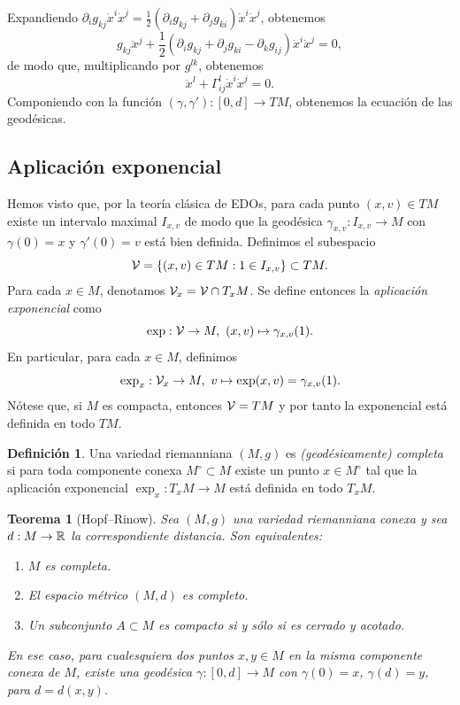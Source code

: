 \documentclass[11pt,a4paper]{amsbook}
\newtheorem{thm}[subsection]{Teorema}
\theoremstyle{remark} \newtheorem{rmk}[subsection]{Observación}
\theoremstyle{definition} \newtheorem{defn}[subsection]{Definición}
\theoremstyle{definition} \newtheorem{ex}[subsection]{Ejemplo}
\theoremstyle{definition} \newtheorem{ej}[subsection]{Ejercicio}
\begin{document}
Expandiendo $\partial_i g_{kj} \dot{x}^i \dot{x}^j = \tfrac{1}{2}(\partial_i g_{kj} + \partial_j g_{ki}) \dot{x}^i \dot{x}^j$, obtenemos
\begin{equation*}
g_{kj} \ddot{x}^j + \frac{1}{2} (\partial_i g_{kj} + \partial_j g_{ki} - \partial_k g_{ij}) \dot{x}^i \dot{x}^j = 0,
\end{equation*}
de modo que, multiplicando por $g^{lk}$, obtenemos
\begin{equation*}
\ddot{x}^l + \Gamma^l_{ij} \dot{x}^i \dot{x}^j = 0.
\end{equation*}
Componiendo con la función $(\gamma,\gamma'):[0,d]\rightarrow TM$, obtenemos la ecuación de las geodésicas.

\subsection{Aplicación exponencial} Hemos visto que, por la teoría clásica de EDOs, para cada punto $(x,v)\in TM$ existe un intervalo maximal $I_{x,v}$ de modo que la geodésica $\gamma_{x,v}:I_{x,v}\rightarrow M$ con $\gamma(0) = x$ y $\gamma'(0)=v$ está bien definida. Definimos el subespacio
\begin{equation*}
\mathcal V = \left\{ (x,v)\in TM: 1 \in I_{x,v} \right\} \subset TM.
\end{equation*}
Para cada $x\in M$, denotamos $\mathcal V_x = \mathcal V \cap T_xM$.
Se define entonces la \emph{aplicación exponencial} como
\begin{equation*}
\exp: \mathcal V \rightarrow M,\ (x,v) \mapsto \gamma_{x,v} (1).
\end{equation*}
En particular, para cada $x\in M$, definimos
\begin{equation*}
\exp_x: \mathcal V_x \rightarrow M,\ v \mapsto \exp(x,v)= \gamma_{x,v}(1).
\end{equation*}
Nótese que, si $M$ es compacta, entonces $\mathcal V = TM$ y por tanto la exponencial está definida en todo $TM$.

\begin{defn}
Una variedad riemanniana $(M,g)$ es \emph{(geodésicamente) completa} si para toda componente conexa $M^\circ \subset M$ existe un punto $x\in M^\circ$ tal que la aplicación exponencial $\exp_x:T_xM\rightarrow M$ está definida en todo $T_xM$.
\end{defn}

\begin{thm}[Hopf--Rinow]
  Sea $(M,g)$ una variedad riemanniana conexa y sea $d:M\rightarrow \mathbb R$ la correspondiente distancia. Son equivalentes:
  \begin{enumerate}
    \item $M$ es completa.
    \item El espacio métrico $(M,d)$ es completo.
    \item Un subconjunto $A\subset M$ es compacto si y sólo si es cerrado y acotado.
  \end{enumerate}
  En ese caso, para cualesquiera dos puntos $x,y\in M$ en la misma componente conexa de $M$, existe una geodésica $\gamma:[0,d]\rightarrow M$ con $\gamma(0)=x$, $\gamma(d)=y$, para $d=d(x,y)$.
\end{thm}
\end{document}

